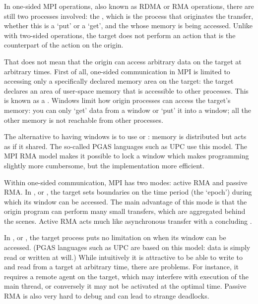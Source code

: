 In one-sided MPI operations, also known as \acf{RDMA} or 
\acf{RMA} operations, there
are still two processes involved: the , which is the
process that originates the transfer, whether this is a `put' or a `get',
and the  whose
memory is being accessed. Unlike with two-sided operations, the target
does not perform an action that is the counterpart of the action on the origin.

That does not mean that the origin can access arbitrary data on the target
at arbitrary times. First of all, one-sided communication in MPI
is limited to accessing only a specifically declared memory area on the target:
the target declares an area of
user-space memory that is accessible to other processes. This is known
as a . Windows limit how origin processes can access
the target's memory: you can only `get' data from a window or `put' it
into a window; all the other memory is not reachable from other processes.

The alternative to having windows is to use 
or : memory is distributed but acts as if
it shared. The so-called \acf{PGAS} languages such as \ac{UPC} use this model.
The MPI \ac{RMA} model makes it possible to 
lock a window which makes programming slightly more cumbersome, but the
implementation more efficient.

Within one-sided communication, MPI has two modes: active RMA and
passive RMA. In , or ,
the target sets boundaries on the time period (the `epoch')
during which its window can be accessed.
The main advantage
of this mode is that the origin program can perform many small transfers, which are
aggregated behind the scenes. Active RMA acts much like asynchronous transfer with a
concluding .

In , or ,
the target process puts no limitation on when its window can be accessed.
(\ac{PGAS} languages such as \ac{UPC} are based on this model: data is 
simply read or written at will.)
While 
intuitively it is attractive to be able to write to and read from a target at
arbitrary time,
there are problems. For instance, it requires a remote agent on the target,
which may interfere with execution of the main thread, or conversely it may not be
activated at the optimal time. Passive RMA is also very hard to debug and can lead
to strange deadlocks.

